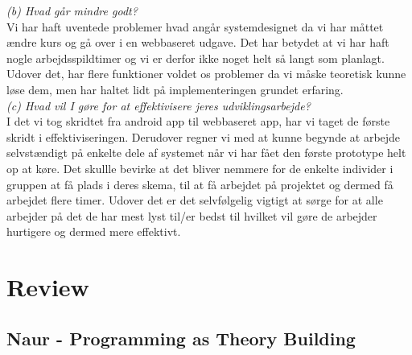 \documentclass[12pt]{article}
\begin{document}
\textit{(b) Hvad går mindre godt?}\\

Vi har haft uventede problemer hvad angår systemdesignet da vi har måttet ændre kurs og gå over i en webbaseret udgave. Det har betydet at vi har haft nogle arbejdsspildtimer og vi er derfor ikke noget helt så langt som planlagt. Udover det, har flere funktioner voldet os problemer da vi måske teoretisk kunne løse dem, men har haltet lidt på implementeringen grundet erfaring. \\

\textit{(c) Hvad vil I gøre for at effektivisere jeres udviklingsarbejde?}\\

I det vi tog skridtet fra android app til webbaseret app, har vi taget de første skridt i effektiviseringen. Derudover regner vi med at kunne begynde at arbejde selvstændigt på enkelte dele af systemet når vi har fået den første prototype helt op at køre. Det skullle bevirke at det bliver nemmere for de enkelte individer i gruppen at få plads i deres skema, til at få arbejdet på projektet og dermed få arbejdet flere timer. Udover det er det selvfølgelig vigtigt at sørge for at alle arbejder på det de har mest lyst til/er bedst til hvilket vil gøre de arbejder hurtigere og dermed mere effektivt.


\pagebreak
\section{Review}
\subsection*{Naur - Programming as Theory Building}
\end{document}
